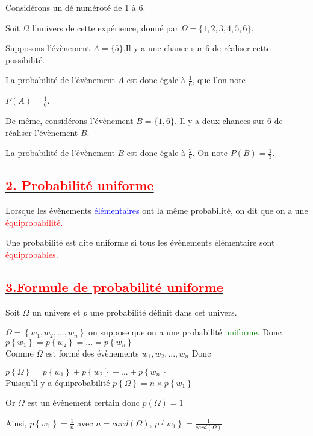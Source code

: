 \documentclass[12pt]{article}
\begin{document}
Considérons un dé numéroté de 1 à 6.

Soit $\Omega$ l'univers de cette expérience, donné par $\Omega=\{1, 2, 3, 4, 5, 6\}$.

Supposons l'évènement $A=\{5\}$.Il y a une chance sur 6 de réaliser cette possibilité.

La probabilité de l'évènement $A$ est donc égale à $\frac{1}{6}$, que l'on note

 $P(A)=\frac{1}{6}$.

De même, considérons l'évènement $B=\{1, 6\}$. Il y a deux chances sur 6 de réaliser l'évènement $B$.

La probabilité de l'évènement $B$ est donc égale à $\frac{2}{6}$. On note $P(B)=\frac{1}{3}$.
\subsection*{\underline{\textbf{\textcolor{red}{2. Probabilité uniforme}}}}
Lorsque les évènements \textcolor{blue}{élémentaires} ont la même probabilité, on dit que on a une 
\textcolor{red}{équiprobabilité.}

Une probabilité est dite uniforme si tous les évènements élémentaire sont \textcolor{red}{équiprobables}.\\
\subsection*{\underline{\textbf{\textcolor{red}{3.Formule de probabilité uniforme}}}}
Soit $\Omega$ un univers et $p$ une probabilité définit dans cet univers.

$\Omega=\left\lbrace w_{1}, w_{2},...,w_{n}\right\rbrace $ on suppose que on a une probabilité \textcolor{green}{uniforme.}
Donc $p\left\lbrace w_{1} \right\rbrace =p\left\lbrace w_{2} \right\rbrace =...
=p\left\lbrace w_{n} \right\rbrace$\\
Comme $\Omega$ est formé des évènements $w_{1}, w_{2},...,w_{n}$ Donc


$p\left\lbrace \Omega\right\rbrace =p\left\lbrace w_{1} \right\rbrace +p\left\lbrace w_{2} \right\rbrace +...+p\left\lbrace w_{n} \right\rbrace$\\
Puisqu'il y a équiprobabilité 
$p\left\lbrace \Omega\right\rbrace =n\times p\left\lbrace w_{1} \right\rbrace$

Or $\Omega$ est un évènement certain donc $p(\Omega)=1$

Ainsi, $p\left\lbrace w_{1} \right\rbrace=\frac{1}{n}$ avec $n=card(\Omega)$, 
$p\left\lbrace w_{1} \right\rbrace=\frac{1}{card(\Omega)}$
\end{document}
